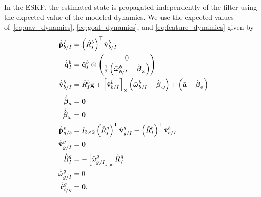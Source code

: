 In the ESKF, the estimated state is propagated independently of the filter using
the expected value of the modeled dynamics. We use the expected values
of~\eqref{eq:uav_dynamics}, \eqref{eq:goal_dynamics}, and
\eqref{eq:feature_dynamics} given by
\begin{align}
  \dot{\hat{\boldsymbol{\mathrm{p}}}}_{b/I}^I
  &=
  \left( \hat{R}_I^b \right)^{\mathsf{T}} \hat{\boldsymbol{\mathrm{v}}}_{b/I}^b
  \label{eq:estimated_dynamics}
  \\
  \dot{\hat{\boldsymbol{\mathrm{q}}}}_{I}^{b} 
  &= 	
  \hat{\boldsymbol{\mathrm{q}}}_I^b \otimes \begin{pmatrix} 0 \\ \frac{1}{2}
  \left( \bar{\boldsymbol{\mathrm{\omega}}}_{b/I}^b - \hat{\boldsymbol{\mathrm{\beta}}}_\omega \right)
\end{pmatrix} \nonumber \\
  \dot{\hat{\boldsymbol{\mathrm{v}}}}_{b/I}^b 
  &=
  \hat{R}_I^b \boldsymbol{\mathrm{g}}
  +
  \left[ \hat{\boldsymbol{\mathrm{v}}}_{b/I}^b \right]_{\times}
  \left( \bar{\boldsymbol{\mathrm{\omega}}}_{b/I}^b - \hat{\boldsymbol{\mathrm{\beta}}}_\omega \right)
  +
  \left( \bar{\boldsymbol{\mathrm{a}}} - \hat{\boldsymbol{\mathrm{\beta}}}_a \right) \nonumber
  \\
  \dot{\hat{\boldsymbol{\mathrm{\beta}}}}_a &= \boldsymbol{\mathrm{0}} \nonumber
  \\
  \dot{\hat{\boldsymbol{\mathrm{\beta}}}}_\omega &= \boldsymbol{\mathrm{0}} \nonumber
  \\
  \dot{\hat{\boldsymbol{\mathrm{p}}}}_{g/b}^{v} &= I_{3 \times 2} \left( \hat{R}_{I}^{g} \right)^{\mathsf{T}}
   \hat{\boldsymbol{\mathrm{v}}}_{g/I}^{g} - \left( \hat{R}_{I}^{b} \right)^{\mathsf{T}}
  \hat{\boldsymbol{\mathrm{v}}}_{b/I}^{b} \nonumber \\
  \dot{\hat{\boldsymbol{\mathrm{v}}}}_{g/I}^{g} &= \boldsymbol{\mathrm{0}} \nonumber \\
  \dot{\hat{R}}_{I}^{g} &= -\left[  \hat{\omega}_{g/I}^g  \right]_{\times} \hat{R}_I^g \nonumber \\
  \dot{\hat{\omega}}_{g/I}^{g} &= 0 \nonumber \\
  \dot{\hat{\boldsymbol{\mathrm{r}}}}_{i/g}^g &= \boldsymbol{\mathrm{0}}. \nonumber
\end{align}


